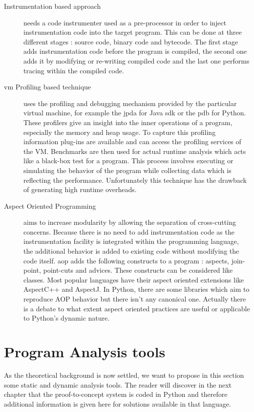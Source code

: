 \begin{description}
  \item[Instrumentation based approach] needs a code instrumenter used as a pre-processor in order to inject instrumentation code into the target program. This can be done at three different stages : source code, binary code and bytecode. The first stage adds instrumentation code before the program is compiled, the second one adds it by modifying or re-writing compiled code and the last one performs tracing within the compiled code.
  
  \item[\gls{vm} Profiling based technique] uses the profiling and debugging mechanism provided by the particular virtual machine, for example the \gls{jpda} for Java \gls{sdk} or the \gls{pdb} for Python. These profilers give an insight into the inner operations of a program, especially the memory and heap usage. To capture this profiling information plug-ins are available and can access the profiling services of the VM. Benchmarks are then used for actual runtime analysis which acts like a black-box test for a program. This process involves executing or simulating the behavior of the program while collecting data which is reflecting the performance. Unfortunately this technique has the drawback of generating high runtime overheads. 
  
  \item[Aspect Oriented Programming] aims to increase modularity by allowing the separation of cross-cutting concerns. Because there is no need to add instrumentation code as the instrumentation facility is integrated within the programming language, the additional behavior is added to existing code without modifying the code itself. \gls{aop} adds the following constructs to a program : aspects, join-point, point-cuts and advices. These constructs can be considered like classes. Most popular languages have their aspect oriented extensions like AspectC++ and AspectJ. In Python, there are some libraries which aim to reproduce AOP behavior but there isn't any canonical one. Actually there is a debate to what extent aspect oriented practices are useful or applicable to Python's dynamic nature. %
  
\end{description}


\section{Program Analysis tools}
As the theoretical background is now settled, we want to propose in this section some static and dynamic analysis tools. The reader will discover in the next chapter that the proof-to-concept system is coded in Python and therefore additional information is given here for solutions available in that language.

